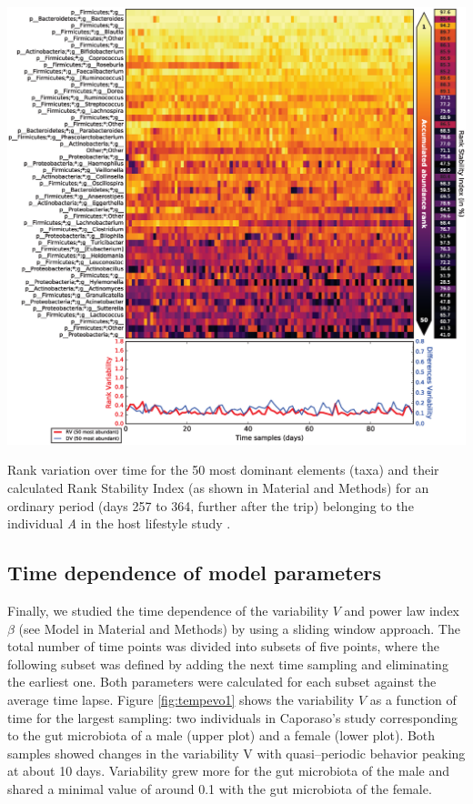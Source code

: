 \begin{supfig}
	\centering
	\includegraphics[width=1.0\textwidth]{figs/supfig_corrank_HLS_StoolA_after.eps}
	\caption{Rank variation over time for the 50 most dominant elements (taxa) and their calculated Rank Stability Index (as shown in Material and Methods) for an ordinary period (days 257 to 364, further after the trip) belonging to the individual \emph{A} in the host lifestyle study \cite{hostlife}.}
	\label{supfig:corrank_HLS_after}
\end{supfig}

\subsection*{Time dependence of model parameters}

Finally, we studied the time dependence of the variability $V$ and power law index $\beta$ (see Model in Material and Methods) by using a sliding window approach. The total number of time points was divided into subsets of five points, where the following subset was defined by adding the next time sampling and eliminating the earliest one. Both parameters were calculated for each subset against the average time lapse. Figure \ref{fig:tempevo1} shows the variability $V$ as a function of time for the largest sampling: two individuals in Caporaso's study\cite{moving} corresponding to the gut microbiota of a male (upper plot) and a female (lower plot). Both samples showed changes in the variability V with quasi--periodic behavior peaking at about 10 days. Variability grew more for the gut microbiota of the male and shared a minimal value of around 0.1 with the gut microbiota of the female. 

